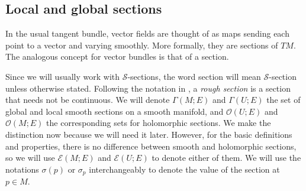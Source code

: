 \subsection{Local and global sections}
In the usual tangent bundle, vector fields are thought of as maps sending each point to a vector and varying smoothly. More formally, they are sections of \(TM\). The analogous concept for vector bundles is that of a section.


Since we will usually work with \(\mathcal{S}\)-sections, the word section will mean \(\mathcal{S}\)-section unless otherwise stated. Following the notation in \parencite{lee_introSM}, a \textit{rough section} is a section that needs not be continuous. We will denote \(\Gamma(M;E)\) and \(\Gamma(U;E)\) the set of global and local smooth sections on a smooth manifold, and \(\mathcal{O}(U;E)\) and \(\mathcal{O}(M;E)\) the corresponding sets for holomorphic sections. We make the distinction now because we will need it later. However, for the basic definitions and properties, there is no difference between smooth and holomorphic sections, so we will use \(\mathscr{E}(M;E)\) and \(\mathscr{E}(U;E)\) to denote either of them. We will use the notations \(\sigma(p)\) or \(\sigma_p\) interchangeably to denote the value of the section at \(p \in M\).


